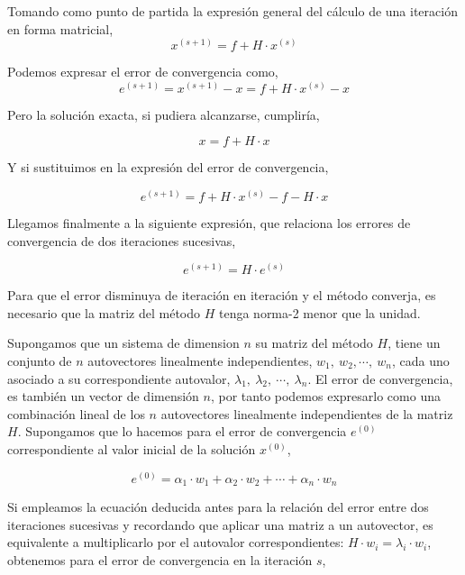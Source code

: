 Tomando como punto de partida la expresión general del cálculo de una iteración en forma matricial,
\begin{equation*}
x^{(s+1)}=f+H\cdot x^{(s)}
\end{equation*}

Podemos expresar el error de convergencia como,
\begin{equation*}
e^{(s+1)}=x^{(s+1)}-x=f+H\cdot x^{(s)}-x
\end{equation*}

Pero la solución exacta, si pudiera alcanzarse, cumpliría,

\begin{equation*}
x=f+H\cdot x
\end{equation*}

Y si sustituimos en la expresión del error de convergencia,

\begin{equation*}
e^{(s+1)}=f+H\cdot x^{(s)}-f-H\cdot x
\end{equation*}

Llegamos finalmente a la siguiente expresión, que relaciona los errores de convergencia de dos iteraciones sucesivas,

\begin{equation*}
e^{(s+1)}=H\cdot e^{(s)}
\end{equation*}

Para que el error disminuya de iteración en iteración y el método converja, es necesario que la matriz del método $H$ tenga norma-2  menor que la unidad.

Supongamos que un sistema de dimension $n$ su matriz del método $H$, tiene un conjunto de $n$ autovectores linealmente independientes, $w_1, \ w_2, \cdots, \ w_n$, cada uno asociado a su correspondiente autovalor, $\lambda_1, \ \lambda_2, \ \cdots,\ \lambda_n$. El error de convergencia, es también un vector de dimensión $n$, por tanto podemos expresarlo como una combinación lineal de los $n$ autovectores linealmente independientes de la matriz $H$. Supongamos que lo hacemos para el error de convergencia $e^{(0)}$correspondiente al valor inicial de la solución $x^{(0)}$,

\begin{equation*}
e^{(0)}=\alpha_1\cdot w_1+\alpha_2\cdot w_2+\cdots+\alpha_n\cdot w_n
\end{equation*}

Si empleamos la ecuación deducida antes para la relación del error entre dos iteraciones sucesivas y recordando que aplicar una matriz a un autovector, es equivalente a multiplicarlo por el autovalor correspondientes: $H\cdot w_i=\lambda_i\cdot w_i$, obtenemos para el error de convergencia en la iteración $s$,

